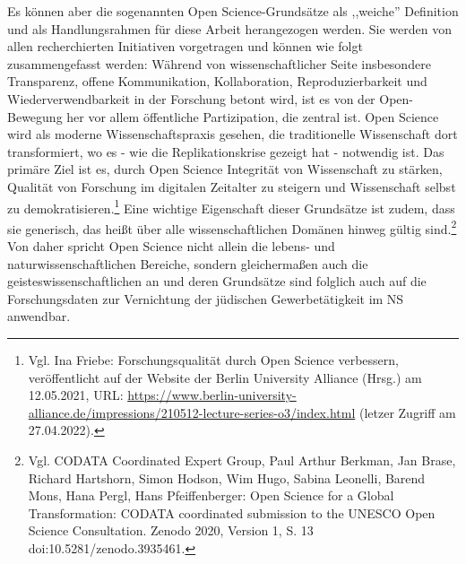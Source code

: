 Es können aber die sogenannten Open Science-Grundsätze als ,,weiche'' Definition und als Handlungsrahmen für diese Arbeit herangezogen werden. Sie werden von allen recherchierten Initiativen vorgetragen und können wie folgt zusammengefasst werden: Während von wissenschaftlicher Seite insbesondere Transparenz, offene Kommunikation, Kollaboration, Reproduzierbarkeit und Wiederverwendbarkeit in der Forschung betont wird, ist es von der Open-Bewegung her vor allem öffentliche Partizipation, die zentral ist. Open Science wird als moderne Wissenschaftspraxis gesehen, die traditionelle Wissenschaft dort transformiert, wo es - wie die Replikationskrise gezeigt hat - notwendig ist. Das primäre Ziel ist es, durch Open Science Integrität von Wissenschaft zu stärken, Qualität von Forschung im digitalen Zeitalter zu steigern und Wissenschaft selbst zu demokratisieren.\footnote{Vgl. Ina Friebe: Forschungsqualität durch Open Science verbessern, veröffentlicht auf der Website der Berlin University Alliance (Hrsg.) am 12.05.2021, URL: \url{https://www.berlin-university-alliance.de/impressions/210512-lecture-series-o3/index.html} (letzer Zugriff am 27.04.2022).} Eine wichtige Eigenschaft dieser Grundsätze ist zudem, dass sie generisch, das heißt über alle wissenschaftlichen Domänen hinweg gültig sind.\footnote{Vgl. CODATA Coordinated Expert Group, Paul Arthur Berkman, Jan Brase, Richard Hartshorn, Simon Hodson, Wim Hugo, Sabina Leonelli, Barend Mons, Hana Pergl, Hans Pfeiffenberger: Open Science for a Global Transformation: CODATA coordinated submission to the UNESCO Open Science Consultation. Zenodo 2020, Version 1, S. 13 doi:10.5281/zenodo.3935461.} Von daher spricht Open Science nicht allein die lebens- und naturwissenschaftlichen Bereiche, sondern gleichermaßen auch die geisteswissenschaftlichen an und deren Grundsätze sind folglich auch auf die Forschungsdaten zur Vernichtung der jüdischen Gewerbetätigkeit im NS anwendbar.

